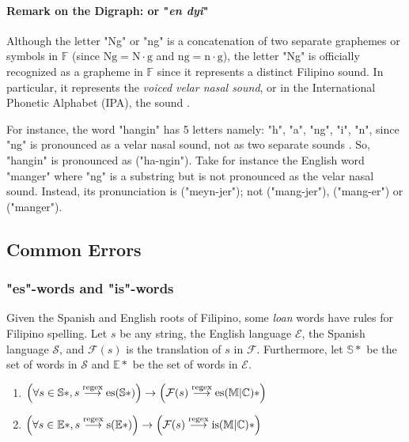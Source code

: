 \paragraph{Remark on the Digraph:  or "\textit{en dyi}"}

Although the letter "Ng" or "ng" is a concatenation of two separate graphemes or
symbols in \(\mathbb{F}\) (since \(\text{Ng} = \text{N}\cdot\text{g}\) and
\(\text{ng} = \text{n}\cdot\text{g}\)), the letter "Ng" is officially recognized
as a grapheme in \(\mathbb{F}\) since it represents a distinct Filipino sound.
In particular, it represents the \textit{voiced velar nasal sound}, or in the International
Phonetic Alphabet (IPA), the  sound \cite{Malabonga_2009}.

For instance, the word "hangin" has 5 letters namely: "h", "a", "ng", "i", "n",
since "ng" is pronounced as a velar nasal sound, not as two separate sounds
. So, "hangin" is pronounced as  ("ha-ngin").
Take for instance the English  word "manger" where "ng" is a substring
but is not pronounced as the velar nasal sound. Instead, its pronunciation is
 ("meyn-jer"); not
 ("mang-jer"),
 ("mang-er") or
 ("manger").

\subsection{Common Errors}

\subsubsection{"es"-words and "is"-words}

Given the Spanish and English roots of Filipino, some \textit{loan} words have
rules for Filipino spelling. Let \(s\) be any string, the English language
\(\mathcal{E}\), the Spanish language \(\mathcal{S}\), and \(\mathcal{F}(s)\) is
the translation of \(s\) in \(\mathcal{F}\). Furthermore, let \(\mathbb{S}*\) be
the set of words in \(\mathcal{S}\) and \(\mathbb{E}*\) be the set of words in
\(\mathcal{E}\).

\begin{enumerate}
      \item \(\left(\forall s\in \mathbb{S}*,s \overset{\text{regex}}{\longrightarrow} \text{es}(\mathbb{S}*) \right) \rightarrow \left(\mathcal{F}(s) \overset{\text{regex}}{\longrightarrow} \text{es}
                  (\mathbb{M}|\mathbb{C})*\right) \)
      \item \(\left(\forall s\in \mathbb{E}*,s \overset{\text{regex}}{\longrightarrow} \text{s}(\mathbb{E}*)\right) \rightarrow  \left(\mathcal{F}(s) \overset{\text{regex}}{\longrightarrow} \text{is}
                  (\mathbb{M}|\mathbb{C})* \right)\)
\end{enumerate}

